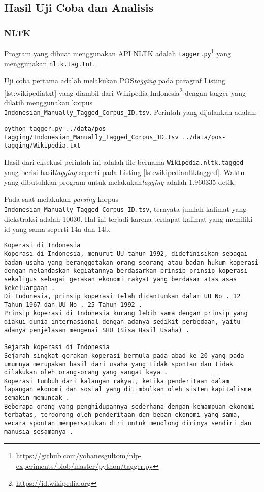 \documentclass[paper=a4, fontsize=11pt]{scrartcl} %
\numberwithin{equation}{section} %
\numberwithin{figure}{section} %
\numberwithin{table}{section} %
\begin{document}
\subsection{Hasil Uji Coba dan Analisis}

\subsubsection{NLTK}

Program yang dibuat menggunakan API NLTK adalah \verb|tagger.py|\footnote{\url{https://github.com/yohanesgultom/nlp-experiments/blob/master/python/tagger.py}} yang menggunakan \verb|nltk.tag.tnt|.

Uji coba pertama adalah melakukan POS\textit{tagging} pada paragraf Listing \ref{lst:wikipediatxt} yang diambil dari Wikipedia Indonesia\footnote{\url{https://id.wikipedia.org}} dengan tagger yang dilatih menggunakan korpus\\ \verb|Indonesian_Manually_Tagged_Corpus_ID.tsv|. Perintah yang dijalankan adalah:

\begin{lstlisting}
python tagger.py ../data/pos-tagging/Indonesian_Manually_Tagged_Corpus_ID.tsv ../data/pos-tagging/Wikipedia.txt
\end{lstlisting}

Hasil dari eksekusi perintah ini adalah file bernama \verb|Wikipedia.nltk.tagged| yang berisi hasil\textit{tagging} seperti pada Listing \ref{lst:wikipedianltktagged}. Waktu yang dibutuhkan program untuk melakukan\textit{tagging} adalah 1.960335 detik.

Pada saat melakukan \textit{parsing} korpus \verb|Indonesian_Manually_Tagged_Corpus_ID.tsv|, ternyata jumlah kalimat yang diekstraksi adalah 10030. Hal ini terjadi karena terdapat kalimat yang memiliki id yang sama seperti 14a dan 14b.

\begin{lstlisting}[caption={Wikipedia.txt},label={lst:wikipediatxt}]
Koperasi di Indonesia
Koperasi di Indonesia, menurut UU tahun 1992, didefinisikan sebagai badan usaha yang beranggotakan orang-seorang atau badan hukum koperasi dengan melandaskan kegiatannya berdasarkan prinsip-prinsip koperasi sekaligus sebagai gerakan ekonomi rakyat yang berdasar atas asas kekeluargaan .
Di Indonesia, prinsip koperasi telah dicantumkan dalam UU No . 12 Tahun 1967 dan UU No . 25 Tahun 1992 .
Prinsip koperasi di Indonesia kurang lebih sama dengan prinsip yang diakui dunia internasional dengan adanya sedikit perbedaan, yaitu adanya penjelasan mengenai SHU (Sisa Hasil Usaha) .

Sejarah koperasi di Indonesia
Sejarah singkat gerakan koperasi bermula pada abad ke-20 yang pada umumnya merupakan hasil dari usaha yang tidak spontan dan tidak dilakukan oleh orang-orang yang sangat kaya .
Koperasi tumbuh dari kalangan rakyat, ketika penderitaan dalam lapangan ekonomi dan sosial yang ditimbulkan oleh sistem kapitalisme semakin memuncak .
Beberapa orang yang penghidupannya sederhana dengan kemampuan ekonomi terbatas, terdorong oleh penderitaan dan beban ekonomi yang sama, secara spontan mempersatukan diri untuk menolong dirinya sendiri dan manusia sesamanya .
\end{lstlisting}
\end{document}
